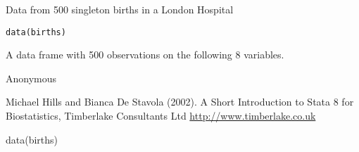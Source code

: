 \begin{Description}\relax
Data from 500 singleton births in a London Hospital
\end{Description}
\begin{Usage}
\begin{verbatim}data(births)\end{verbatim}
\end{Usage}
\begin{Format}\relax
A data frame with 500 observations on the following 8 variables.
\end{Format}
\begin{Source}\relax
Anonymous
\end{Source}
\begin{References}\relax
Michael Hills and Bianca De Stavola (2002). A Short Introduction to
Stata 8 for Biostatistics, Timberlake Consultants Ltd
\url{http://www.timberlake.co.uk}
\end{References}
\begin{Examples}
\begin{ExampleCode}
data(births)
\end{ExampleCode}
\end{Examples}

